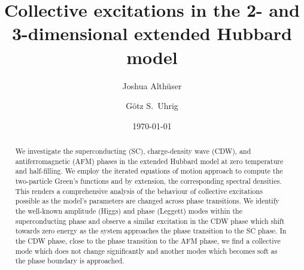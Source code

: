 \documentclass[
    reprint, 
    aps,
    preprintnumbers,
    twocolumn,
    prb,
    superscriptaddress
]{revtex4-2}
\begin{document}
 

\title{Collective excitations in the 2- and 3-dimensional extended Hubbard model}


\author{Joshua Alth\"user}

\author{G\"otz S.~Uhrig}

\date{\today}

\begin{abstract}
    We investigate the superconducting (SC), charge-density wave (CDW), and antiferromagnetic (AFM) phases 
    in the extended Hubbard model at zero temperature and half-filling.
    We employ the iterated equations of motion approach \cite{Kalthoff17,bleicker18} to compute the two-particle Green's functions and
    by extension, the corresponding spectral densities.
    This renders a comprehensive analysis of the behaviour of collective excitations possible
    as the model's parameters are changed across phase transitions.
    We identify the well-known amplitude (Higgs) and phase (Leggett) modes within the 
    superconducting phase and observe a similar excitation in the CDW phase
    which shift towards zero energy as the system approaches the phase transition to the SC phase.
    In the CDW phase, close to the phase transition to the AFM phase, we find a collective mode 
    which does not change significantly and another modes which becomes soft
    as the phase boundary is approached.
\end{abstract}

\maketitle
\end{document}
